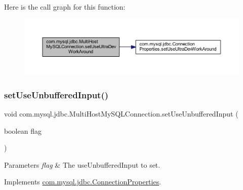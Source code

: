 Here is the call graph for this function\+:
\nopagebreak
\begin{figure}[H]
\begin{center}
\leavevmode
\includegraphics[width=350pt]{classcom_1_1mysql_1_1jdbc_1_1_multi_host_my_s_q_l_connection_a2280fcb76a916e625848333e80572871_cgraph}
\end{center}
\end{figure}
\mbox{\label{classcom_1_1mysql_1_1jdbc_1_1_multi_host_my_s_q_l_connection_a19da5784ea3e4f024042178f171d0441}} 
\subsubsection{\texorpdfstring{set\+Use\+Unbuffered\+Input()}{setUseUnbufferedInput()}}
{\footnotesize\ttfamily void com.\+mysql.\+jdbc.\+Multi\+Host\+My\+S\+Q\+L\+Connection.\+set\+Use\+Unbuffered\+Input (\begin{DoxyParamCaption}\item[{boolean}]{flag }\end{DoxyParamCaption})}


\begin{DoxyParams}{Parameters}
{\em flag} & The use\+Unbuffered\+Input to set. \\
\hline
\end{DoxyParams}


Implements \mbox{\hyperlink{interfacecom_1_1mysql_1_1jdbc_1_1_connection_properties_a5a30b9513cdbfaf75d822a3942c5bf6b}{com.\+mysql.\+jdbc.\+Connection\+Properties}}.

